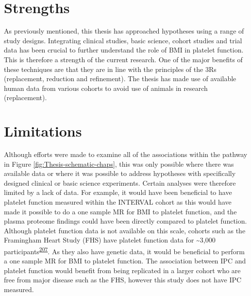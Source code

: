 \documentclass[11pt,twoside]{bristolthesis}
\begin{document}
\hypertarget{strengths}{%
\section{Strengths}\label{strengths}}

As previously mentioned, this thesis has approached hypotheses using a range of study designs. Integrating clinical studies, basic science, cohort studies and trial data has been crucial to further understand the role of BMI in platelet function. This is therefore a strength of the current research. One of the major benefits of these techniques are that they are in line with the principles of the 3Rs (replacement, reduction and refinement). The thesis has made use of available human data from various cohorts to avoid use of animals in research (replacement).

\hypertarget{limitations}{%
\section{Limitations}\label{limitations}}

Although efforts were made to examine all of the associations within the pathway in Figure \ref{fig:Thesis-schematic-chaps}, this was only possible where there was available data or where it was possible to address hypotheses with specifically designed clinical or basic science experiments. Certain analyses were therefore limited by a lack of data. For example, it would have been beneficial to have platelet function measured within the INTERVAL cohort as this would have made it possible to do a one sample MR for BMI to platelet function, and the plasma proteome findings could have been directly compared to platelet function. Although platelet function data is not available on this scale, cohorts such as the Framingham Heart Study (FHS) have platelet function data for \textasciitilde3,000 participants\textsuperscript{\protect\hyperlink{ref-Rodriguez2020}{207}}. As they also have genetic data, it would be beneficial to perform a one sample MR for BMI to platelet function. The association between IPC and platelet function would benefit from being replicated in a larger cohort who are free from major disease such as the FHS, however this study does not have IPC measured.
\end{document}
